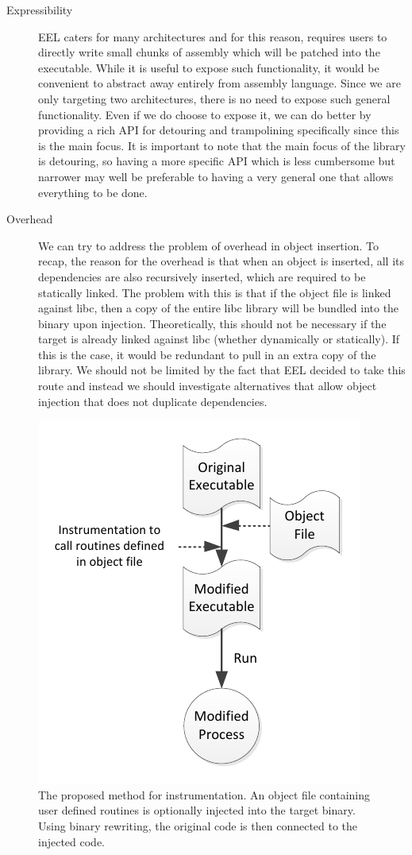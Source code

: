 \begin{description}
\item[Expressibility] EEL caters for many architectures and for this reason, requires users to directly write small chunks of assembly which will be patched into the executable. While it is useful to expose such functionality, it would be convenient to abstract away entirely from assembly language. Since we are only targeting two architectures, there is no need to expose such general functionality. Even if we do choose to expose it, we can do better by providing a rich API for detouring and trampolining specifically since this is the main focus. It is important to note that the main focus of the library is detouring, so having a more specific API which is less cumbersome but narrower may well be preferable to having a very general one that allows everything to be done.
\item[Overhead] We can try to address the problem of overhead in object insertion. To recap, the reason for the overhead is that when an object is inserted, all its dependencies are also recursively inserted, which are required to be statically linked. The problem with this is that if the object file is linked against libc, then a copy of the entire libc library will be bundled into the binary upon injection. Theoretically, this should not be necessary if the target is already linked against libc (whether dynamically or statically). If this is the case, it would be redundant to pull in an extra copy of the library. We should not be limited by the fact that EEL decided to take this route and instead we should investigate alternatives that allow object injection that does not duplicate dependencies.
\end{description}

\begin{figure}[H]
 \centering
 \includegraphics{Workflow.pdf}
 \caption[Hierarchy]{The proposed method for instrumentation. An object file containing user defined routines is optionally injected into the target binary. Using binary rewriting, the original code is then connected to the injected code.}
\label{fig:Workflow}
\end{figure}

